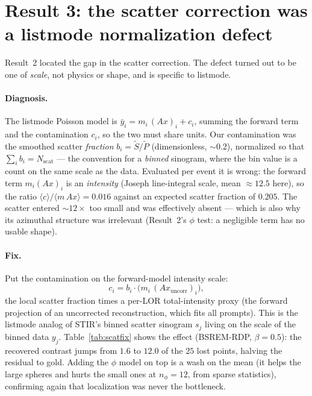\documentclass[11pt]{article}
\begin{document}
\section{Result 3: the scatter correction was a listmode normalization defect}
Result~2 located the gap in the scatter correction. The defect turned out to be one of
\emph{scale}, not physics or shape, and is specific to listmode.

\paragraph{Diagnosis.} The listmode Poisson model is
$\bar y_i = m_i\,(Ax)_i + c_i$, summing the forward term and the contamination $c_i$, so
the two must share units. Our contamination was the smoothed scatter \emph{fraction}
$b_i = \tilde S/\tilde P$ (dimensionless, $\sim\!0.2$), normalized so that
$\sum_i b_i = N_{\text{scat}}$ --- the convention for a \emph{binned} sinogram, where the
bin value is a count on the same scale as the data. Evaluated per event it is wrong: the
forward term $m_i (Ax)_i$ is an \emph{intensity} (Joseph line-integral scale, mean
$\approx 12.5$ here), so the ratio $\langle c\rangle/\langle m\,Ax\rangle = 0.016$ against
an expected scatter fraction of $0.205$. The scatter entered $\sim\!12\times$ too small
and was effectively absent --- which is also why its azimuthal structure was irrelevant
(Result~2's $\phi$ test: a negligible term has no usable shape).

\paragraph{Fix.} Put the contamination on the forward-model intensity scale:
\[
  c_i = b_i \cdot \big(m_i\,(Ax_{\text{uncorr}})_i\big),
\]
the local scatter fraction times a per-LOR total-intensity proxy (the forward projection
of an uncorrected reconstruction, which fits all prompts). This is the listmode analog of
STIR's binned scatter sinogram $s_j$ living on the scale of the binned data $y_j$.
Table~\ref{tab:scatfix} shows the effect (BSREM-RDP, $\beta=0.5$): the recovered contrast
jumps from $1.6$ to $12.0$ of the $25$ lost points, halving the residual to gold. Adding
the $\phi$ model on top is a wash on the mean (it helps the large spheres and hurts the
small ones at $n_\phi=12$, from sparse statistics), confirming again that localization was
never the bottleneck.
\end{document}
